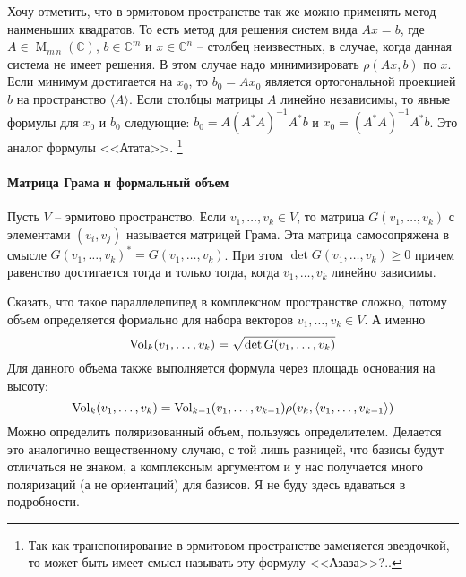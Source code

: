 Хочу отметить, что в эрмитовом пространстве так же можно применять метод наименьших квадратов.
То есть метод для решения систем вида $Ax = b$, где $A\in \operatorname{M}_{m\,n}(\mathbb C)$, $b\in \mathbb C^m$ и $x\in\mathbb C^n$ -- столбец неизвестных, в случае, когда данная система не имеет решения.
В этом случае надо минимизировать $\rho(Ax, b)$ по $x$.
Если минимум достигается на $x_0$, то $b_0 = Ax_0$ является ортогональной проекцией $b$ на пространство $\langle A \rangle$.
Если столбцы матрицы $A$ линейно независимы, то явные формулы для $x_0$ и $b_0$ следующие: $b_0 = A(A^*A)^{-1}A^*b$ и $x_0 = (A^*A)^{-1}A^*b$.
Это аналог формулы <<Атата>>.%
\footnote{Так как транспонирование в эрмитовом пространстве заменяется звездочкой, то может быть имеет смысл называть эту формулу <<Азаза>>?..}

\paragraph{Матрица Грама и формальный объем}

Пусть $V$ -- эрмитово пространство.
Если $v_1,\ldots,v_k\in V$, то матрица $G(v_1,\ldots,v_k)$ с элементами $(v_i, v_j)$ называется матрицей Грама.
Эта матрица самосопряжена в смысле $G(v_1,\ldots,v_k)^* = G(v_1,\ldots,v_k)$.
При этом $\det G(v_1,\ldots,v_k)\geqslant 0$ причем равенство достигается тогда и только тогда, когда $v_1,\ldots,v_k$ линейно зависимы.

Сказать, что такое параллелепипед в комплексном пространстве сложно, потому объем определяется формально для набора векторов $v_1,\ldots,v_k\in V$.
А именно
\[
\operatorname{Vol}_k(v_1,\ldots,v_k) = \sqrt{\det G(v_1,\ldots,v_k)}
\]
Для данного объема также выполняется формула через площадь основания на высоту:
\[
\operatorname{Vol}_k(v_1,\ldots,v_k) = \operatorname{Vol}_{k-1}(v_1,\ldots,v_{k-1}) \rho(v_k, \langle v_1,\ldots,v_{k-1}\rangle)
\]
Можно определить поляризованный объем, пользуясь определителем.
Делается это аналогично вещественному случаю, с той лишь разницей, что базисы будут отличаться  не знаком, а комплексным аргументом и у нас получается много поляризаций (а не ориентаций) для базисов.
Я не буду здесь вдаваться в подробности.
